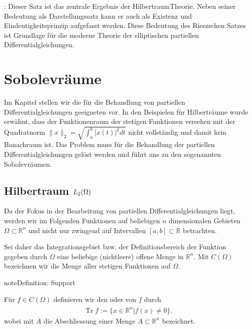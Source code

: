 \documentclass[letterpaper,10pt,english]{jupyterBook}
\begin{document}
: Dieser Satz ist das zentrale Ergebnis der Hilbertraum\sphinxhyphen{}Theorie. Neben seiner Bedeutung als Darstellungssatz kann er auch als Existenz\sphinxhyphen{} und Eindeutigkeitsprinzip aufgefasst werden. Diese Bedeutung des Rieszschen Satzes ist Grundlage für die moderne Theorie der elliptischen partiellen Differentialgleichungen.


\chapter{Sobolevräume}
\label{\detokenize{Funktionalanalysis/Sobolevraeume:sobolevraume}}\label{\detokenize{Funktionalanalysis/Sobolevraeume::doc}}
Im Kapitel stellen wir die für die Behandlung von partiellen Differentialgleichungen geeigneten  vor.
In den Beispielen für Hilberträume wurde erwähnt, dass der Funktionenraum der stetigen Funktionen versehen mit der Quadratnorm \(\|x\|_2 = \sqrt{\int_a^b |x(t)|^2 dt}\) nicht vollständig und damit kein Banachraum ist. Das Problem muss für die Behandlung der partiellen Differentialgleichungen gelöst werden und führt uns zu den sogenannten Sobolevräumen.


\section{Hilbertraum \protect\(L_2(\Omega)\protect\)}
\label{\detokenize{Funktionalanalysis/Sobolevraeume:hilbertraum-l-2-omega}}
Da der Fokus in der Bearbeitung von partiellen Differentialgleichungen liegt, werden wir im Folgenden Funktionen auf beliebigen \(n\) dimensionalen Gebieten \(\Omega \subset \mathbb{R}^n\) und nicht nur zwingend auf Intervallen \([a,b] \subset \mathbb{R}\) betrachten.

Sei daher das Integrationsgebiet bzw. der Definitionsbereich der Funktion gegeben durch \(\Omega\) eine beliebige (nichtleere) offene Menge in \(\mathbb{R}^n\). Mit \(C(\Omega)\) bezeichnen wir die Menge aller stetigen Funktionen auf \(\Omega\).

\begin{sphinxadmonition}{note}{Definition: Support}

Für \(f\in C(\Omega)\) definieren wir den  oder  von \(f\) durch
\begin{equation*}
\begin{split}\mathop{Tr} f := \overline{\{x\in\mathbb{R}^n | f(x) \not=0 \}}.\end{split}
\end{equation*}
wobei mit \(\overline{A}\) die Abschliessung einer Menge \(A \subset \mathbb{R}^n\) bezeichnet.
\end{sphinxadmonition}
\end{document}
